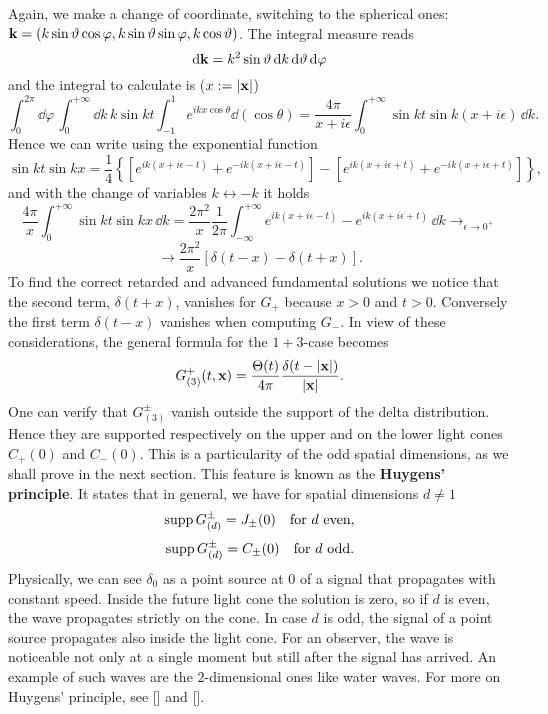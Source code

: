 Again, we make a change of coordinate, switching to the spherical ones: $\mathbf{k}=(k\sin\vartheta\cos\varphi,k\sin\vartheta\sin\varphi,k\cos\vartheta)$. The integral measure reads
\[	\mathrm d\mathbf{k}=k^2\sin\vartheta\,\mathrm d k\,\mathrm d\vartheta\,\mathrm d\varphi		\]
and the integral to calculate is ($x:=|\mathbf{x}|$)
\[	\int_{0}^{2\pi}\dd\varphi\,\int_{0}^{+\infty}\dd k\,k\sin kt\int_{-1}^{1}	e^{ikx\cos\theta}\dd(\cos\theta)=\frac{4\pi}{x+i\epsilon}\int_{0}^{+\infty}\sin kt\sin k(x+i\epsilon)\,\dd k.	\]
Hence we can write using the exponential function
\[	\sin kt\sin kx=\frac{1}{4}\left\{\left[e^{ik(x+i\epsilon-t)}+e^{-ik(x+i\epsilon-t)}\right]-\left[e^{ik(x+i\epsilon+t)}+e^{-ik(x+i\epsilon+t)}\right]\right\},	\]
and with the change of variables $k\leftrightarrow-k$ it holds
\[	\frac{4\pi}{x}\int_{0}^{+\infty}\sin kt\sin kx\,\dd k=\frac{2\pi^2}{x}\frac{1}{2\pi}\int_{-\infty}^{+\infty}e^{ik(x+i\epsilon-t)}-e^{ik(x+i\epsilon+t)}\,\dd k\mathop{\longrightarrow}_{\epsilon\to 0^+}	\]
\[	\longrightarrow\frac{2\pi^2}{x}\left[\delta(t-x)-\delta(t+x)\right].		\]
To find the correct retarded and advanced fundamental solutions we notice that the second term, $\delta(t+x)$, vanishes for $G_+$ because $x>0$ and $t>0$. Conversely the first term $\delta(t-x)$ vanishes when computing $G_-$. In view of these considerations, the general formula for the $1+3$-case becomes
\begin{equation}
G_{(3)}^{+}(t,\mathbf{x})=\frac{\Theta( t)}{4\pi}\frac{\delta(t- |\mathbf{x}|)}{|\mathbf{x}|}.
\label{eq:green3d}
\end{equation}
One can verify that $G_{(3)}^{\pm}$ vanish outside the support of the delta distribution. Hence they are supported respectively on the upper and on the lower light cones $C_+(0)$ and $C_-(0)$. This is a particularity of the odd spatial dimensions, as we shall prove in the next section. This feature is known as the \textbf{Huygens' principle}. It states that in general, we have for spatial dimensions $d\neq 1$
\[	\text{supp}\, G_{(d)}^{\pm}= J_{\pm}(0)\quad\text{for } d\text{ even},		\]
\[	\text{supp}\, G_{(d)}^{\pm}= C_{\pm}(0)\quad\text{for } d\text{ odd.}		\]
Physically, we can see $\delta_0$ as a point source at $0$ of a signal that propagates with constant speed. Inside the future light cone the solution is zero, so if $d$ is even, the wave propagates strictly on the cone. In case $d$ is odd,
the signal of a point source propagates also inside the light cone. For an observer, the wave is noticeable not only at a single moment but still after the signal has arrived. An example of such
waves are the $2$-dimensional ones like water waves. For more on Huygens' principle, see [\citealp{gunther}] and [\citealp[Ch. 5]{jonsson}].








